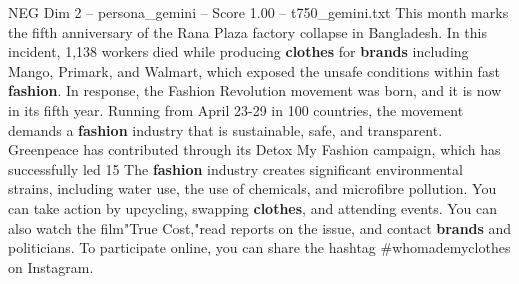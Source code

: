 \begin{textsample}{NEG Dim 2 – persona\_gemini – Score 1.00 – t750\_gemini.txt}  \label{ex:f2_neg_015}
This month marks the fifth anniversary of the Rana Plaza factory collapse in Bangladesh.
In this incident, 1,138 workers died while producing \textbf{clothes} for \textbf{brands} including Mango, Primark, and Walmart, which exposed the unsafe conditions within fast \textbf{fashion}.
In response, the Fashion Revolution movement was born, and it is now in its fifth year.
Running from April 23-29 in 100 countries, the movement demands a \textbf{fashion} industry that is sustainable, safe, and transparent.
Greenpeace has contributed through its Detox My Fashion campaign, which has successfully led 15 %
The \textbf{fashion} industry creates significant environmental strains, including water use, the use of chemicals, and microfibre pollution.
You can take action by upcycling, swapping \textbf{clothes}, and attending events.
You can also watch the film"True Cost,"read reports on the issue, and contact \textbf{brands} and politicians.
To participate online, you can share the hashtag \#whomademyclothes on Instagram.

\end{textsample}
